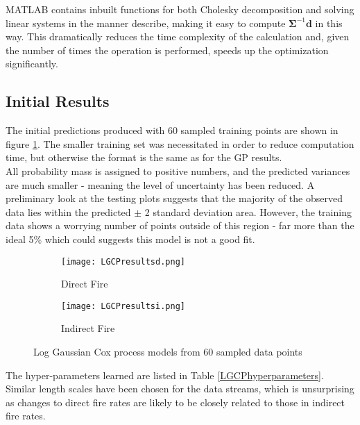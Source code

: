 \documentclass[a4paper,11pt]{report}
\begin{document}
MATLAB contains inbuilt functions for both Cholesky decomposition and solving linear systems in the manner describe, making it easy to compute \(\boldsymbol{\Sigma}^{-1} \mathbf{d}\) in this way. This dramatically reduces the time complexity of the calculation and, given the number of times the operation is performed, speeds up the optimization significantly. \par


\subsection{Initial Results}

The initial predictions produced with 60 sampled training points are shown in figure \ref{fig:LGCPresults}. The smaller training set was necessitated in order to reduce computation time, but otherwise the format is the same as for the GP results. \\

All probability mass is assigned to positive numbers, and the predicted variances are much smaller - meaning the level of uncertainty has been reduced. A preliminary look at the testing plots suggests that the majority of the observed  data lies within the predicted \(\pm\) 2 standard deviation area. However, the training data shows a worrying number of points outside of this region - far more than the ideal 5\% which could suggests this model is not a good fit. 

\par
\begin{figure}
\centering
\begin{subfigure}{.5\textwidth}
	\centering
	\texttt{[image: LGCPresultsd.png]}
  	\caption{Direct Fire}
\end{subfigure}%
\begin{subfigure}{.5\textwidth}
  	\centering
  	\texttt{[image: LGCPresultsi.png]}
  	\caption{Indirect Fire}
\end{subfigure}
\caption{Log Gaussian Cox process models from 60 sampled data points}
\label{fig:LGCPresults}
\end{figure}

The hyper-parameters learned are listed in Table \ref{LGCPhyperparameters}. Similar length scales have been chosen for the data streams, which is unsurprising as changes to direct fire rates are likely to be closely related to those in indirect fire rates. 

\end{document}
